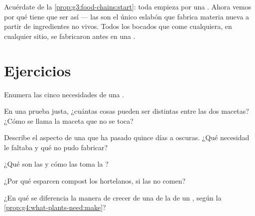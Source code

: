 \begin{remark}\label{rem:g4:what-plants-need:everyone}
Acuérdate de la \cref{prop:g3:food-chains:start}: toda  empieza por una . Ahora vemos por qué tiene que ser
así --- las  son el único eslabón que fabrica materia nueva a
partir de ingredientes no vivos. Todos los bocados que come cualquiera,
en cualquier sitio, se fabricaron antes en una .
\end{remark}

\section{Ejercicios}

\begin{exercise}[$\star$]\label{exo:g4:what-plants-need:1}
Enumera las cinco necesidades de una .
\end{exercise}

\begin{exercise}[$\star$]\label{exo:g4:what-plants-need:2}
En una prueba justa, ¿cuántas cosas pueden ser distintas entre las dos
macetas? ¿Cómo se llama la maceta que no se toca?
\end{exercise}

\begin{exercise}[$\star$]\label{exo:g4:what-plants-need:3}
Describe el aspecto de una  que ha pasado quince días a oscuras.
¿Qué necesidad le faltaba y qué no pudo fabricar?
\end{exercise}

\begin{exercise}[$\star$]\label{exo:g4:what-plants-need:4}
¿Qué son las  y cómo las toma la ?
\end{exercise}

\begin{exercise}[$\star$]\label{exo:g4:what-plants-need:5}
¿Por qué esparcen compost los hortelanos, si las  no comen?
\end{exercise}

\begin{exercise}[$\star$]\label{exo:g4:what-plants-need:6}
¿En qué se diferencia la manera de crecer de una  de la de un
, según la \cref{prop:g4:what-plants-need:make}?
\end{exercise}

